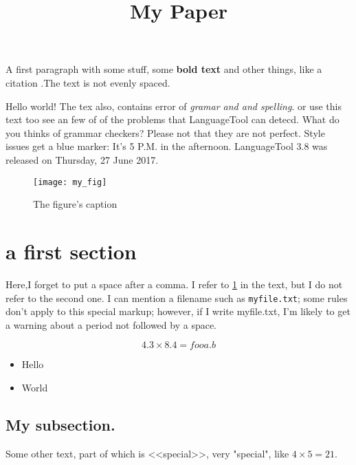 \documentclass{article}
\begin{document}
\title{My Paper}
\maketitle

A first paragraph with some stuff, some \textbf{bold text}   and other things, like a citation\cite{my:paper} .The text is  not evenly spaced.

Hello world! The tex also, contains error of \emph{gramar and and spelling}. or use this text too see an few of of the problems that LanguageTool can detecd. What do you thinks of grammar checkers? Please not that they are not perfect. Style issues get a blue marker: It's 5 P.M. in the afternoon. LanguageTool 3.8 was released on Thursday, 27 June 2017.

\begin{figure}
\texttt{[image: my\_fig]}
\caption{The figure's caption}
\label{fig:thisfig1}
\end{figure}

\section{a first section}

Here,I forget to put a space after a comma. I refer to \ref{fig:thisfig1} in the text, but I do not refer to the second one. I can mention a filename such as \verb+myfile.txt+; some rules don't apply to this special markup; however, if I write myfile.txt, I'm likely to get a warning about a period not followed by a space.

\begin{equation*}
4.3 \times 8.4 = foo a.b
\end{equation*}

\begin{itemize}
\item Hello %
\item   World
\end{itemize}

\subsection{ My subsection. }

Some other text, part of which is <<special>>, very "special", like $4 \times 5 = 21$.

\end{document}
